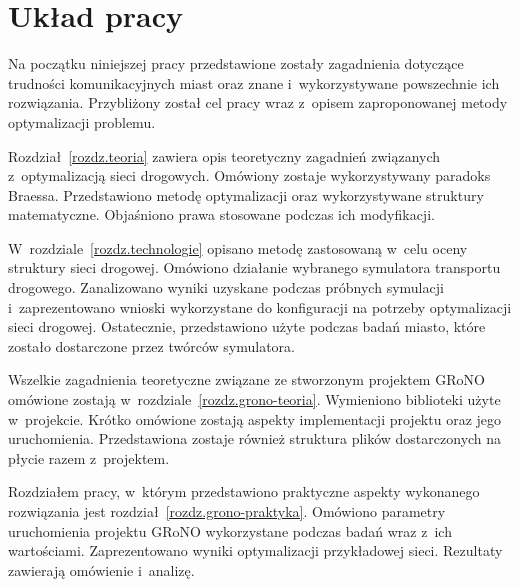 \documentclass[twoside,12pt]{report}
\begin{document}


\section{Układ pracy}
Na początku niniejszej pracy przedstawione zostały zagadnienia dotyczące trudności komunikacyjnych miast oraz znane i~wykorzystywane powszechnie ich rozwiązania. Przybliżony został cel pracy wraz z~opisem zaproponowanej metody optymalizacji problemu. 

Rozdział~\ref{rozdz.teoria} zawiera opis teoretyczny zagadnień związanych z~optymalizacją sieci drogowych. Omówiony zostaje wykorzystywany paradoks Braessa. Przedstawiono metodę optymalizacji oraz wykorzystywane struktury matematyczne. Objaśniono prawa stosowane podczas ich modyfikacji.

W~rozdziale~\ref{rozdz.technologie} opisano metodę zastosowaną w~celu oceny struktury sieci drogowej. Omówiono działanie wybranego symulatora transportu drogowego. Zanalizowano wyniki uzyskane podczas próbnych symulacji i~zaprezentowano wnioski wykorzystane do konfiguracji na potrzeby optymalizacji sieci drogowej. Ostatecznie, przedstawiono użyte podczas badań miasto, które zostało dostarczone przez twórców symulatora.

Wszelkie zagadnienia teoretyczne związane ze stworzonym projektem GRoNO omówione zostają w~rozdziale~\ref{rozdz.grono-teoria}. Wymieniono biblioteki użyte w~projekcie. Krótko omówione zostają aspekty implementacji projektu oraz jego uruchomienia. Przedstawiona zostaje również struktura plików dostarczonych na płycie razem z~projektem.

Rozdziałem pracy, w~którym przedstawiono praktyczne aspekty wykonanego rozwiązania  jest rozdział~\ref{rozdz.grono-praktyka}. Omówiono parametry uruchomienia projektu GRoNO wykorzystane podczas badań wraz z~ich wartościami. Zaprezentowano wyniki optymalizacji przykładowej sieci. Rezultaty zawierają  omówienie i~analizę.
\end{document}
